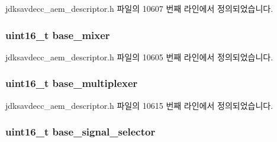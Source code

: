 jdksavdecc\+\_\+aem\+\_\+descriptor.\+h 파일의 10607 번째 라인에서 정의되었습니다.

\subsubsection[{\texorpdfstring{base\+\_\+mixer}{base_mixer}}]{\setlength{\rightskip}{0pt plus 5cm}uint16\+\_\+t base\+\_\+mixer}\hypertarget{structjdksavdecc__descriptor__sensor__unit_ad2cbeba461f7e25ffee9118ab1343ee0}{}\label{structjdksavdecc__descriptor__sensor__unit_ad2cbeba461f7e25ffee9118ab1343ee0}


jdksavdecc\+\_\+aem\+\_\+descriptor.\+h 파일의 10605 번째 라인에서 정의되었습니다.

\subsubsection[{\texorpdfstring{base\+\_\+multiplexer}{base_multiplexer}}]{\setlength{\rightskip}{0pt plus 5cm}uint16\+\_\+t base\+\_\+multiplexer}\hypertarget{structjdksavdecc__descriptor__sensor__unit_a3e13f295f26afe3335587c18790c7dda}{}\label{structjdksavdecc__descriptor__sensor__unit_a3e13f295f26afe3335587c18790c7dda}


jdksavdecc\+\_\+aem\+\_\+descriptor.\+h 파일의 10615 번째 라인에서 정의되었습니다.

\subsubsection[{\texorpdfstring{base\+\_\+signal\+\_\+selector}{base_signal_selector}}]{\setlength{\rightskip}{0pt plus 5cm}uint16\+\_\+t base\+\_\+signal\+\_\+selector}\hypertarget{structjdksavdecc__descriptor__sensor__unit_a5bd998af8a76ae1336006ec16829b64d}{}\label{structjdksavdecc__descriptor__sensor__unit_a5bd998af8a76ae1336006ec16829b64d}


